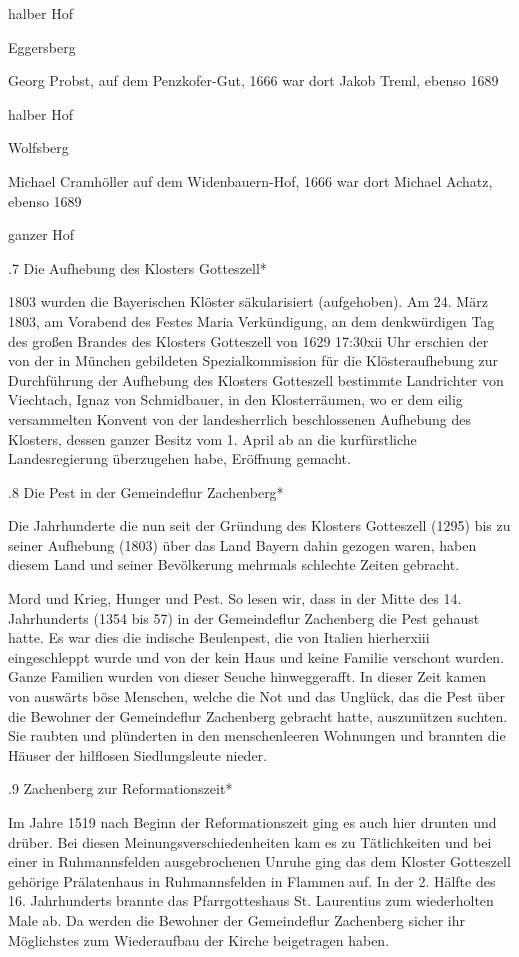 halber Hof

Eggersberg

Georg Probst, auf dem Penzkofer-Gut, 1666 war dort Jakob Treml, ebenso 1689

halber Hof

Wolfsberg

Michael Cramhöller auf dem Widenbauern-Hof, 1666 war dort Michael Achatz, ebenso
1689

ganzer Hof

.7 Die Aufhebung des Klosters Gotteszell*

1803 wurden die Bayerischen Klöster säkularisiert (aufgehoben). Am 24. März
1803, am Vorabend des Festes Maria Verkündigung, an dem denkwürdigen Tag des
großen Brandes des Klosters Gotteszell von 1629 17:30xii Uhr erschien der von
der in München gebildeten Spezialkommission für die Klösteraufhebung zur
Durchführung der Aufhebung des Klosters Gotteszell bestimmte Landrichter von
Viechtach, Ignaz von Schmidbauer, in den Klosterräumen, wo er dem eilig
versammelten Konvent von der landesherrlich beschlossenen Aufhebung des
Klosters, dessen ganzer Besitz vom 1. April ab an die kurfürstliche
Landesregierung überzugehen habe, Eröffnung gemacht.

.8 Die Pest in der Gemeindeflur Zachenberg*

Die Jahrhunderte die nun seit der Gründung des Klosters Gotteszell (1295) bis zu
seiner Aufhebung (1803) über das Land Bayern dahin gezogen waren, haben diesem
Land und seiner Bevölkerung mehrmals schlechte Zeiten gebracht.

Mord und Krieg, Hunger und Pest. So lesen wir, dass in der Mitte des 14.
Jahrhunderts (1354 bis 57) in der Gemeindeflur Zachenberg die Pest gehaust
hatte. Es war dies die indische Beulenpest, die von Italien hierherxiii
eingeschleppt wurde und von der kein Haus und keine Familie verschont wurden.
Ganze Familien wurden von dieser Seuche hinweggerafft. In dieser Zeit kamen von
auswärts böse Menschen, welche die Not und das Unglück, das die Pest über die
Bewohner der Gemeindeflur Zachenberg gebracht hatte, auszunützen suchten. Sie
raubten und plünderten in den menschenleeren Wohnungen und brannten die Häuser
der hilflosen Siedlungsleute nieder.

.9 Zachenberg zur Reformationszeit*

Im Jahre 1519 nach Beginn der Reformationszeit ging es auch hier drunten und
drüber. Bei diesen Meinungsverschiedenheiten kam es zu Tätlichkeiten und bei
einer in Ruhmannsfelden ausgebrochenen Unruhe ging das dem Kloster Gotteszell
gehörige Prälatenhaus in Ruhmannsfelden in Flammen auf. In der 2. Hälfte des 16.
Jahrhunderts brannte das Pfarrgotteshaus St. Laurentius zum wiederholten Male
ab. Da werden die Bewohner der Gemeindeflur Zachenberg sicher ihr Möglichstes
zum Wiederaufbau der Kirche beigetragen haben.

